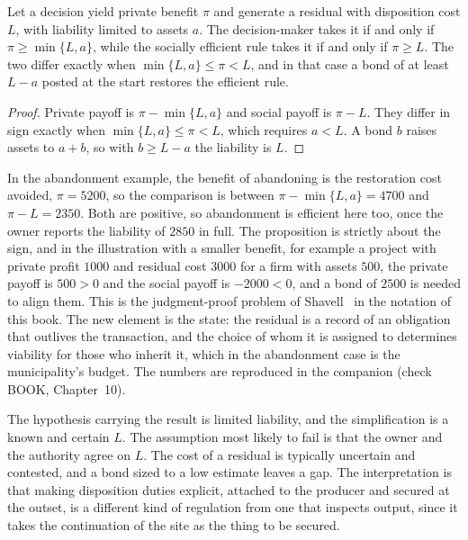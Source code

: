 \begin{proposition}\label{prop:residual}
Let a decision yield private benefit $\pi$ and generate a residual with disposition cost $L$, with liability limited to assets $a$. The decision-maker takes it if and only if $\pi\ge\min\{L,a\}$, while the socially efficient rule takes it if and only if $\pi\ge L$. The two differ exactly when $\min\{L,a\}\le\pi<L$, and in that case a bond of at least $L-a$ posted at the start restores the efficient rule.
\end{proposition}

\begin{proof}
Private payoff is $\pi-\min\{L,a\}$ and social payoff is $\pi-L$. They differ in sign exactly when $\min\{L,a\}\le\pi<L$, which requires $a<L$. A bond $b$ raises assets to $a+b$, so with $b\ge L-a$ the liability is $L$.
\end{proof}

In the abandonment example, the benefit of abandoning is the restoration cost avoided, $\pi=5200$, so the comparison is between $\pi-\min\{L,a\}=4700$ and $\pi-L=2350$. Both are positive, so abandonment is efficient here too, once the owner reports the liability of $2850$ in full. The proposition is strictly about the sign, and in the illustration with a smaller benefit, for example a project with private profit $1000$ and residual cost $3000$ for a firm with assets $500$, the private payoff is $500>0$ and the social payoff is $-2000<0$, and a bond of $2500$ is needed to align them. This is the judgment-proof problem of Shavell~\cite{shavell1986} in the notation of this book. The new element is the state: the residual is a record of an obligation that outlives the transaction, and the choice of whom it is assigned to determines viability for those who inherit it, which in the abandonment case is the municipality's budget. The numbers are reproduced in the companion (check BOOK, Chapter~10).

The hypothesis carrying the result is limited liability, and the simplification is a known and certain $L$. The assumption most likely to fail is that the owner and the authority agree on $L$. The cost of a residual is typically uncertain and contested, and a bond sized to a low estimate leaves a gap. The interpretation is that making disposition duties explicit, attached to the producer and secured at the outset, is a different kind of regulation from one that inspects output, since it takes the continuation of the site as the thing to be secured.

